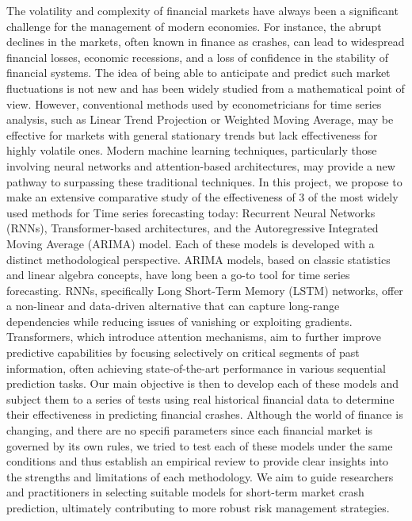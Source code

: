 \documentclass[12pt, letterpaper]{article}
\begin{document}
The volatility and complexity of financial markets have always been a significant challenge for the management of modern economies. For instance, the abrupt declines in the markets, often known in finance as crashes, can lead to widespread financial losses, economic recessions, and a loss of confidence in the stability of financial systems. The idea of being able to anticipate and predict such market fluctuations is not new and has been widely studied from a mathematical point of view. However, conventional methods used by econometricians for time series analysis, such as Linear Trend Projection or Weighted Moving Average, may be effective for markets with general stationary trends but lack effectiveness for highly volatile ones. Modern machine learning techniques, particularly those involving neural networks and attention-based architectures, may provide a new pathway to surpassing these traditional techniques.
In this project, we propose to make an extensive comparative study of the effectiveness of 3 of the most widely used methods for Time series forecasting today: Recurrent Neural Networks (RNNs), Transformer-based architectures, and the Autoregressive Integrated Moving Average (ARIMA) model. Each of these models is developed with a distinct methodological perspective. ARIMA models, based on classic statistics and linear algebra concepts, have long been a go-to tool for time series forecasting. RNNs, specifically Long Short-Term Memory (LSTM) networks, offer a non-linear and data-driven alternative that can capture long-range dependencies while reducing issues of vanishing or exploiting gradients. Transformers, which introduce attention mechanisms, aim to further improve predictive capabilities by focusing selectively on critical segments of past information, often achieving state-of-the-art performance in various sequential prediction tasks.
Our main objective is then to develop each of these models and subject them to a series of tests using real historical financial data to determine their effectiveness in predicting financial crashes. Although the world of finance is changing, and there are no specifi parameters since each financial market is governed by its own rules, we tried to test each of these models under the same conditions and thus establish an empirical review to provide clear insights into the strengths and limitations of each methodology. We aim to guide researchers and practitioners in selecting suitable models for short-term market crash prediction, ultimately contributing to more robust risk management strategies.
\end{document}
